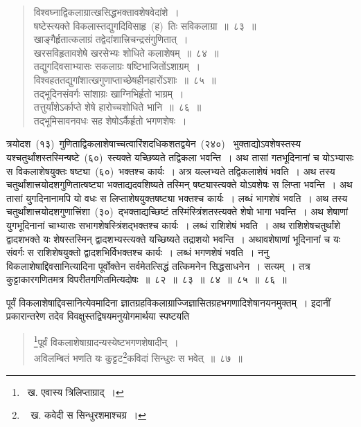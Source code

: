 \documentclass[11pt, openany]{book}
\begin{document}
\begin{quote}
{\ks विश्वघ्नाद्विकलाग्रात्खसिद्धभक्तावशेषवेदांशे~।\\
षष्टेस्त्यक्ते विकलास्तद्युगदिविसाहृ~(ह)~तिः सविकलाग्रा~॥~८३~॥\\
खाङ्गैर्हृतात्कलाग्रं तद्वेदांशात्त्रिचन्द्रसंगुणितात्~।\\
खरसविहृतावशेषे खरसेभ्यः शोधिते कलाशेषम्~॥~८४~॥\\
तद्युगदिवसाभ्यासः सकलाग्रः षष्टिभाजितोंऽशाग्रम्~।\\
विश्वहततद्युगांशात्खगुणाप्ताच्छेषहीनहारोंऽशाः~॥~८५~॥\\
तद्भूदिनसंवर्गः सांशाग्रः खाग्निभिर्हृतो भाग्रम्~।\\
तत्तुर्यांशेऽर्काप्ते शेषे हारोच्चशोधिते भानि~॥~८६~॥\\
तद्भूमिसावनवधः सह शेषोऽर्कैर्हृतो भगणशेषः~।}
\end{quote}

\indent
त्रयोदश~(१३)~गुणिताद्विकलाशेषाच्चत्वारिंशदधिकशतद्वयेन~(२४०)~ भुक्ताद्योऽवशेषस्तस्य यश्चतुर्थांशस्तस्मिन्षष्टे~(६०)~स्त्यक्ते यच्छिष्यते तद्विकला भवन्ति~। अथ तासां गतभूदिनानां च योऽभ्यासः स विकलाशेषयुक्तः षष्ट्या~(६०)~भक्तश्च कार्यः~। अत्र यल्लभ्यते तद्विकलाशेषं भवति~। अथ तस्य चतुर्थांशात्त्रयोदशगुणितात्षष्ट्या भक्ताद्यदवशिष्यते तस्मिन् षष्ट्यास्त्यक्ते योऽवशेषः स लिप्ता भवन्ति~। अथ तासां युगदिनानामपि यो वधः स लिप्ताशेषयुक्तषष्ट्या भक्तश्च कार्यः~। लब्धं भागशेषं भवति~।
अथ तस्य चतुर्थांशात्त्रयोदशगुणात्त्रिंशा~(३०)~द्भक्ताद्यच्छिष्टं तस्मिंस्त्रिंशतस्त्यक्ते शेषो भागा भवन्ति~। अथ शेषाणां युगभूदिनानां चाभ्यासः सभागशेषस्त्रिंशद्भक्तश्च कार्यः~। लब्धं राशिशेषं भवति~। अथ राशिशेषचतुर्थांशे द्वादशभक्ते यः शेषस्तस्मिन् द्वादशभ्यस्त्यक्ते यच्छिष्यते तद्राशयो भवन्ति~। अथावशेषाणां भूदिनानां च यः संवर्गः स राशिशेषयुक्तो द्वादशभिर्विभक्तश्च कार्यः~। लब्धं भगणशेषं भवति~। ननु विकलाशेषाद्दिवसानित्यादिना पूर्वोक्तेन सर्वमेतत्सिद्धं तत्किमनेन सिद्धसाधनेन~। सत्यम्~। तत्र कुट्टाकारगणितमत्र विपरीतगणितमित्यदोषः~॥~८२~॥~८३~॥~८४~॥~८५~॥~८६~॥

\newpage
\thispagestyle{fancy}
\fancyhf{}

\indent
पूर्वं विकलाशेषाद्दिवसानित्येवमादिना ज्ञातग्रहविकलाग्राज्जिज्ञासितग्रहभगणादिशेषानयनमुक्तम्~। इदानीं प्रकारान्तरेण तदेव विवक्षुस्तद्विषयमनुयोगमार्थया स्पष्टयति\textendash

\begin{quote}
{\ks \renewcommand\thefootnote{१}\footnote{~ख. एवास्य त्रिलिप्ताग्राद्~।}पूर्वं विकलाशेषाग्रादन्यस्येष्टभगणशेषादीन्~।\\
अविलम्बितं भणति यः कुट्टट\renewcommand\thefootnote{२}\footnote{~ ख. कवेदी स सिन्धुरशमाश्चग्र~।}कविदां सिन्धुरः स भवेत्~॥~८७~॥}
\end{quote}
\end{document}
